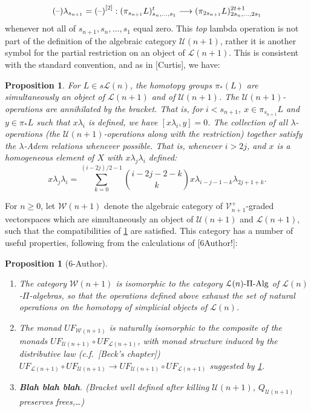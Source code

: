 \documentclass[11pt]{amsart}
\theoremstyle{plain}
\newtheorem{prop}[thm]{Proposition}
\theoremstyle{definition}
\newcommand{\DASH}{\textup{--}}
\renewcommand{\to}{\longrightarrow}
\newcommand{\squishlist}{
  \setlength{\itemsep}{.5pt}
  \setlength{\parskip}{0pt}
  \setlength{\parsep}{0pt}}
\newcommand{\calW}{\mathcal{W}}
\newcommand{\calU}{\mathcal{U}}
\newcommand{\calL}{\mathcal{L}}
\newcommand{\calV}{\mathcal{V}}
\theoremstyle{plain}
\newcommand{\restn}[1]{{#1}^{[2]}}
\newcommand{\vect}[2]{\calV^{#1}_{#2}}
\newcommand{\PiAlg}{\textup{-$\Pi$-Alg}}
\begin{document}
\begin{Lie algebras in characteristic 2 and their homotopy operations}
\[(\DASH)\lambda_{s_{n+1}}=\restn{(\DASH)}:(\pi_{s_{n+1}}L)_{s_n,\ldots,s_1}^t\to (\pi_{2s_{n+1}}L)_{2s_n,\ldots,2s_1}^{2t+1}\]
whenever not all of $s_{n+1},s_n,\ldots,s_1$ equal zero. This \emph{top} lambda operation is not part of the definition of the algebraic category $\calU(n+1)$, rather it is another symbol for the partial restriction on an object of $\calL(n+1)$. This is consistent with the standard convention, and as in [Curtis], we have:
\begin{prop}\label{compatibilities between U and L in W}
For $L\in s\calL(n)$, the homotopy groups $\pi_*(L)$ are simultaneously an object of $\calL(n+1)$ and of $\calU(n+1)$. The $\calU(n+1)$-operations are annihilated by the bracket. That is, for $i<s_{n+1}$, $x\in\pi_{s_{n+1}}L$ and $y\in \pi_*L$ such that $x\lambda_i$ is defined, we have $[x\lambda_i,y]=0$. The collection of all $\lambda$-operations (the $\calU(n+1)$-operations along with the restriction) together satisfy the $\lambda$-Adem relations whenever possible. That is, whenever $i>2j$, and $x$ is a homogeneous element of $X$ with $x\lambda_j\lambda_i$ defined:
\[x\lambda_j\lambda_i=\sum_{k=0}^{(i-2j)/2-1}{i-2j-2-k\choose k}x\lambda_{i-j-1-k}\lambda_{2j+1+k}.\]
\end{prop}
For $n\geq0$, let $\calW(n+1)$ denote the algebraic category of $\vect{+}{n+1}$-graded vectorspaces which are simultaneously an object of $\calU(n+1)$ and $\calL(n+1)$, such that the compatibilities of \ref{compatibilities between U and L in W} are satisfied. This category has a number of useful properties, following from the calculations of [6Author!]:
\begin{prop}[6-Author]\hfil
\begin{enumerate}\squishlist
\setlength{\parindent}{.25in}
\item The category $\calW(n+1)$ is isomorphic to the category $\calL(n)\PiAlg$ of $\calL(n)$-$\Pi$-algebras, so that the operations defined above exhaust the set of natural operations on the homotopy of simplicial objects of $\calL(n)$.
\item The monad $UF_{\calW(n+1)}$ is naturally isomorphic to the composite of the monads $UF_{\calU(n+1)}\circ UF_{\calL(n+1)}$, with monad structure induced by the distributive law (c.f.\ [Beck's chapter]) $UF_{\calL(n+1)}\circ UF_{\calU(n+1)}\to UF_{\calU(n+1)}\circ UF_{\calL(n+1)}$ suggested by \ref{compatibilities between U and L in W}.
\item \textbf{Blah blah blah}. (Bracket well defined after killing $\calU(n+1)$, $Q_{\calU(n+1)}$ preserves frees,\ldots)
\end{enumerate}
\end{prop}


\end{Lie algebras in characteristic 2 and their homotopy operations}
\end{document}
